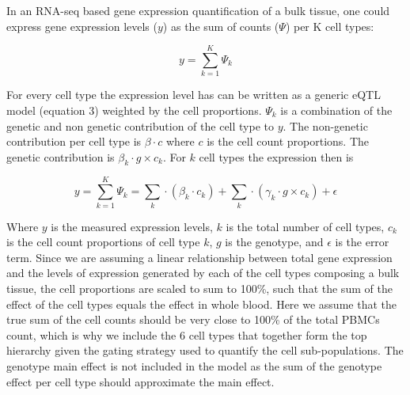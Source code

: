 In an RNA-seq based gene expression quantification of a bulk tissue, one could express gene expression levels ($y$) as the sum of counts ($\Psi$) per K cell types:

\begin{equation}
y = \sum_{k=1}^{K} \Psi_{k}
\end{equation}

For every cell type the expression level has can be written as a generic eQTL model (equation 3) weighted by the cell proportions. $\Psi_{k}$ is a combination of the genetic and non genetic contribution of the cell type to $y$. The non-genetic contribution per cell type is $\beta \cdot c$ where $c$ is the cell count proportions. The genetic contribution is $\beta_{k} \cdot g \times c_{k}$. For $k$ cell types the expression then is 

\begin{equation}
y = \sum_{k=1}^K \Psi_{k} = \sum_{k}\cdot ( \beta_{k}\cdot c_{k} ) + \sum_{k} \cdot (\gamma_{k} \cdot g \times c_{k}) + \epsilon
\end{equation}

Where $y$ is the measured expression levels, $k$ is the total number of cell types, $c_{k}$ is the cell count proportions of cell type $k$, $g$ is the genotype, and $\epsilon$ is the error term. Since we are assuming a linear relationship between total gene expression and the levels of expression generated by each of the cell types composing a bulk tissue, the cell proportions are scaled to sum to 100\%, such that the sum of the effect of the cell types equals the effect in whole blood. Here we assume that the true sum of the cell counts should be very close to 100\% of the total PBMCs count, which is why we include the 6 cell types that together form the top hierarchy given the gating strategy used to quantify the cell sub-populations\cite{aguirre-gamboaDifferentialEffectsEnvironmental2016}. The genotype main effect is not included in the model as the sum of the genotype effect per cell type should approximate the main effect.

